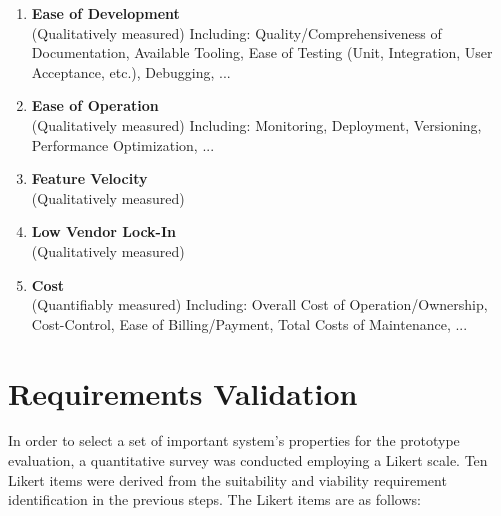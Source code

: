 \begin{enumerate}
    \item \textbf{Ease of Development}\\
        (Qualitatively measured) Including: Quality/Comprehensiveness of Documentation, Available Tooling, Ease of Testing (Unit, Integration, User Acceptance, etc.), Debugging, ...
    \item \textbf{Ease of Operation}\\
        (Qualitatively measured) Including: Monitoring, Deployment, Versioning, Performance Optimization, ...
    \item \textbf{Feature Velocity}\\
        (Qualitatively measured) 
    \item \textbf{Low Vendor Lock-In}\\
        (Qualitatively measured) 
    \item \textbf{Cost}\\
        (Quantifiably measured) Including: Overall Cost of Operation/Ownership, Cost-Control, Ease of Billing/Payment, Total Costs of Maintenance, ...
\end{enumerate}


\section{Requirements Validation}\label{sec:reqVal}

In order to select a set of important system's properties for the prototype evaluation, a quantitative survey was conducted employing a Likert scale. Ten Likert items were derived from the suitability and viability requirement identification in the previous steps. The Likert items are as follows:

